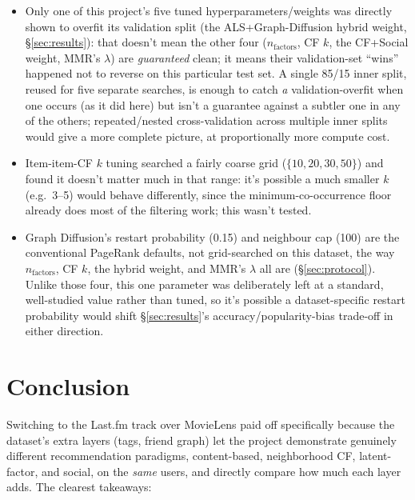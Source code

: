 \documentclass[11pt,a4paper]{article}
\newcommand{\secref}[1]{\S\ref{#1}}
\begin{document}
\begin{itemize}[leftmargin=*]
  \item Only one of this project's five tuned hyperparameters/weights was directly shown to overfit its validation split (the ALS+Graph-Diffusion hybrid weight, \secref{sec:results}): that doesn't mean the other four ($n_{\text{factors}}$, CF $k$, the CF+Social weight, MMR's $\lambda$) are \emph{guaranteed} clean; it means their validation-set ``wins'' happened not to reverse on this particular test set. A single 85/15 inner split, reused for five separate searches, is enough to catch \emph{a} validation-overfit when one occurs (as it did here) but isn't a guarantee against a subtler one in any of the others; repeated/nested cross-validation across multiple inner splits would give a more complete picture, at proportionally more compute cost.
  \item Item-item-CF $k$ tuning searched a fairly coarse grid ($\{10,20,30,50\}$) and found it doesn't matter much in that range: it's possible a much smaller $k$ (e.g.\ 3--5) would behave differently, since the minimum-co-occurrence floor already does most of the filtering work; this wasn't tested.
  \item Graph Diffusion's restart probability (0.15) and neighbour cap (100) are the conventional PageRank defaults, not grid-searched on this dataset, the way $n_{\text{factors}}$, CF $k$, the hybrid weight, and MMR's $\lambda$ all are (\secref{sec:protocol}). Unlike those four, this one parameter was deliberately left at a standard, well-studied value rather than tuned, so it's possible a dataset-specific restart probability would shift \secref{sec:results}'s accuracy/popularity-bias trade-off in either direction.
\end{itemize}

\section{Conclusion}
\label{sec:conclusion}

Switching to the Last.fm track over MovieLens paid off specifically because the dataset's extra layers (tags, friend graph) let the project demonstrate genuinely different recommendation paradigms, content-based, neighborhood CF, latent-factor, and social, on the \emph{same} users, and directly compare how much each layer adds. The clearest takeaways:
\end{document}
